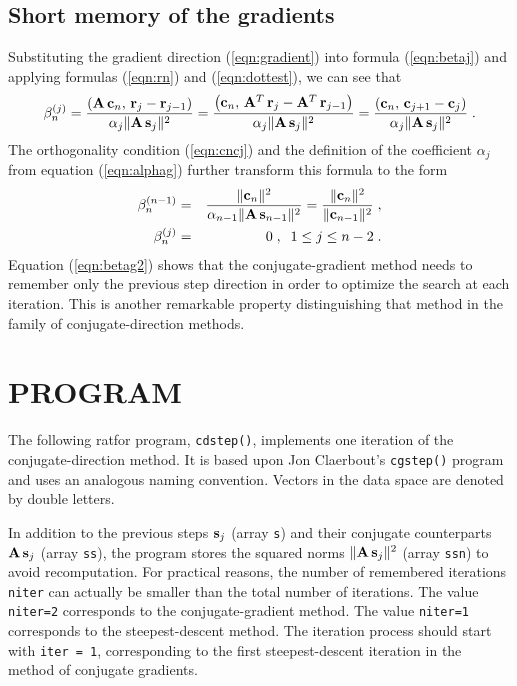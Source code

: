 \subsection{Short memory of the gradients}
Substituting the gradient direction (\ref{eqn:gradient}) into formula
(\ref{eqn:betaj}) and applying formulas (\ref{eqn:rn}) and (\ref{eqn:dottest}), we can
see that
\begin{equation}
\beta_n^{(j)} = 
{{\left({\bf A\,c}_n,\,{\bf r}_{j} - {\bf r}_{j-1}\right)} \over
{\alpha_j\|{\bf A\,s}_{j}\|^2}} =
{{\left({\bf c}_n,\,{\bf A}^T\,{\bf r}_{j} - 
{\bf A}^T\,{\bf r}_{j-1}\right)} \over
{\alpha_j\|{\bf A\,s}_{j}\|^2}} =
{{\left({\bf c}_n,\,{\bf c}_{j+1} - {\bf c}_{j}\right)} \over
{\alpha_j\|{\bf A\,s}_{j}\|^2}}\;.
\label{eqn:betag}
\end{equation} 
The orthogonality condition (\ref{eqn:cncj}) and the definition of the
coefficient $\alpha_j$ from equation (\ref{eqn:alphag}) further transform this formula 
to the form
\begin{eqnarray}
\beta_n^{(n-1)} & = &
{{\|{\bf c}_n\|^2} \over
{\alpha_{n-1}\|{\bf A\,s}_{n-1}\|^2}} =
{{\|{\bf c}_n\|^2} \over
{\|{\bf c}_{n-1}\|^2}}\;,
\label{eqn:betag1} \\
\beta_n^{(j)}  & = & 0\;,\;\;1 \leq j \leq n-2\;.
\label{eqn:betag2}
\end{eqnarray}
Equation (\ref{eqn:betag2}) shows that the conjugate-gradient method needs
to remember only the previous step direction in order to optimize the
search at each iteration. This is another remarkable property
distinguishing that method in the family of conjugate-direction
methods.

\section{PROGRAM}
The following ratfor program, \verb!cdstep()!, implements one iteration
of the conjugate-direction method. It is based upon Jon Claerbout's
\verb!cgstep()! program \cite{Claerbout.tdf.82} and uses an analogous
naming convention. Vectors in the data space are denoted by double
letters.


In addition to the previous steps ${\bf s}_j$ (array
\verb!s!) and their conjugate counterparts ${\bf A\,s}_j$ (array
\verb!ss!), the program stores the squared norms $\|{\bf A\,s}_j\|^2$
(array \verb!ssn!) to avoid recomputation.
For practical reasons, the number of remembered iterations
\verb!niter! can actually be smaller than the total number of
iterations. The value \verb!niter=2! corresponds to the
conjugate-gradient method. The value \verb!niter=1! corresponds to the
steepest-descent method. The iteration process should start with
\verb!iter = 1!, corresponding to the first steepest-descent iteration
in the method of conjugate gradients.

